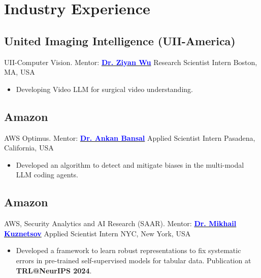 \section{ Industry Experience}
\subsection{United Imaging Intelligence (UII-America)}
      {UII-Computer Vision. Mentor: 
      {\href{https://wuziyan.com/}
        {\textbf{\textcolor{blue}{Dr. Ziyan Wu}}}}}%
      {Research Scientist Intern}%
      {Boston, MA, USA}%
      {}%
      {}
      \vspace{-1.2em}
      {
        \begin{itemize}[itemsep=0pt, parsep=0pt]
        \item Developing Video LLM for surgical video understanding.
        \end{itemize}
      }
      
    \subsection{Amazon}
      {AWS Optimus. Mentor: 
      {\href{https://ankanbansal.com/}
        {\textbf{\textcolor{blue}{Dr. Ankan Bansal}}}}}%
      {Applied Scientist Intern}%
      {Pasadena, California, USA}%
      {}%
      {}
      \vspace{-1.2em}
      {
        \begin{itemize}[itemsep=0pt, parsep=0pt]
        \item Developed an algorithm to detect and mitigate biases in the multi-modal LLM coding agents.
        \end{itemize}
      }
    \subsection{Amazon}
      {AWS, Security Analytics and AI Research (SAAR). Mentor: 
      {\href{https://scholar.google.com/citations?user=fsrkabwAAAAJ&hl=en}
        {\textbf{\textcolor{blue}{Dr. Mikhail Kuznetsov}}}}}%
      {Applied Scientist Intern}%
      {NYC, New York, USA}%
      {}%
      {}
      \vspace{-1.2em}
      {
        \begin{itemize}[itemsep=0pt, parsep=0pt]
        \item Developed a framework to learn robust representations to fix systematic errors in pre-trained self-supervised models for tabular data. Publication at \textbf{TRL@NeurIPS 2024}.
        \end{itemize}
      }
